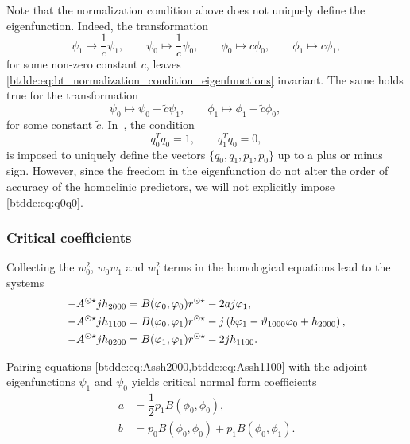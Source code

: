 \begin{remark}
Note that the normalization condition above does not uniquely define the eigenfunction. Indeed,
the transformation
\begin{equation}
    \psi_1 \mapsto \frac1c \psi_1, \qquad
    \psi_0 \mapsto \frac1c \psi_0, \qquad
    \phi_0 \mapsto c \phi_0, \qquad
    \phi_1 \mapsto c \phi_1,
\end{equation}
for some non-zero constant $c$, leaves \cref{btdde:eq:bt_normalization_condition_eigenfunctions} invariant.
The same holds true for the transformation
\begin{equation}
    \psi_0 \mapsto \psi_0 + \tilde c \psi_1, \qquad
    \phi_1 \mapsto \phi_1 - \tilde c \phi_0, \qquad
\end{equation}
for some constant $\tilde c$. In~\cite{Kuznetsov2005practical}, the condition
\begin{equation}
\label{btdde:eq:q0q0} 
q_0^T q_0 = 1,\qquad q_1^T q_0 = 0,
\end{equation}
is imposed to uniquely define the vectors $\{q_0,q_1,p_1,p_0\}$ up to a plus or
minus sign. However, since the freedom in the eigenfunction do not alter the
order of accuracy of the homoclinic predictors, we will not explicitly impose \cref{btdde:eq:q0q0}.
\end{remark}


\subsubsection{Critical coefficients}
\label{btdde:sec:critical_coefficients}
Collecting the $w_0^2$, $w_0w_1$ and $w_1^2$ terms in the homological equations
lead to the systems
\begin{align}
-A^{\odot\star} jh_{2000} & =  B(\varphi_0,\varphi_0)r^{\odot\star} - 2aj\varphi_1 , \label{btdde:eq:Assh2000}\\
-A^{\odot\star} jh_{1100} & =  B(\varphi_0,\varphi_1)r^{\odot\star} - j\left(b\varphi_1 - \vartheta_{1000} \varphi_0 + h_{2000}\right), \label{btdde:eq:Assh1100} \\
-A^{\odot\star} jh_{0200} & =  B(\varphi_1,\varphi_1)r^{\odot\star} - 2j h_{1100}. \label{btdde:eq:Assh0200}
\end{align}

Pairing equations \cref{btdde:eq:Assh2000,btdde:eq:Assh1100} with the adjoint
eigenfunctions $\psi_1$ and $\psi_0$ yields critical normal form coefficients
\begin{align*}
a & = \dfrac{1}{2}p_1B(\phi_0,\phi_0),\\
b & = p_0B(\phi_0,\phi_0) + p_1B(\phi_0,\phi_1).
\end{align*}

